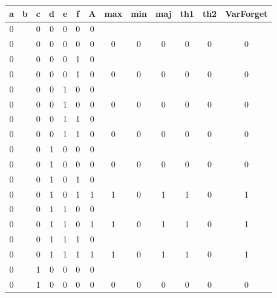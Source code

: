 \begin{table}[!tb]
    \centering
    \begin{tabular}{|c|c|c|c|c|c|c|c|c|c|c|c|c|}
        \hline
        \textbf{a} & \textbf{b} & \textbf{c} & \textbf{d} & \textbf{e} & \textbf{f} & \textbf{A} & \textbf{max} & \textbf{min} & \textbf{maj} & \textbf{th1} & \textbf{th2} & \textbf{VarForget} \\ \hline
        \rowcolor{gray!40} 0 &  & 0 & 0 & 0 & 0 & 0 &  &  &  &  &  &  \\ \hline
        \rowcolor{gray!40} 0 &  & 0 & 0 & 0 & 0 & 0 & 0 & 0 & 0 & 0 & 0 & 0 \\ \hline
        \rowcolor{blue!40} 0 &  & 0 & 0 & 0 & 1 & 0 &  &  &  &  &  &  \\ \hline
        \rowcolor{blue!40} 0 &  & 0 & 0 & 0 & 1 & 0 & 0 & 0 & 0 & 0 & 0 & 0 \\ \hline
        \rowcolor{red!40} 0 &  & 0 & 0 & 1 & 0 & 0 &  &  &  &  &  &  \\ \hline
        \rowcolor{red!40} 0 &  & 0 & 0 & 1 & 0 & 0 & 0 & 0 & 0 & 0 & 0 & 0 \\ \hline
        \rowcolor{green!40} 0 &  & 0 & 0 & 1 & 1 & 0 &  &  &  &  &  &  \\ \hline
        \rowcolor{green!40} 0 &  & 0 & 0 & 1 & 1 & 0 & 0 & 0 & 0 & 0 & 0 & 0 \\ \hline
        \rowcolor{yellow!40} 0 &  & 0 & 1 & 0 & 0 & 0 &  &  &  &  &  &  \\ \hline
        \rowcolor{yellow!40} 0 &  & 0 & 1 & 0 & 0 & 0 & 0 & 0 & 0 & 0 & 0 & 0 \\ \hline
        \rowcolor{gray!40} 0 &  & 0 & 1 & 0 & 1 & 0 &  &  &  &  &  &  \\ \hline
        \rowcolor{gray!40} 0 &  & 0 & 1 & 0 & 1 & 1 & 1 & 0 & 1 & 1 & 0 & 1 \\ \hline
        \rowcolor{blue!40} 0 &  & 0 & 1 & 1 & 0 & 0 &  &  &  &  &  &  \\ \hline
        \rowcolor{blue!40} 0 &  & 0 & 1 & 1 & 0 & 1 & 1 & 0 & 1 & 1 & 0 & 1 \\ \hline
        \rowcolor{red!40} 0 &  & 0 & 1 & 1 & 1 & 0 &  &  &  &  &  &  \\ \hline
        \rowcolor{red!40} 0 &  & 0 & 1 & 1 & 1 & 1 & 1 & 0 & 1 & 1 & 0 & 1 \\ \hline
        \rowcolor{green!40} 0 &  & 1 & 0 & 0 & 0 & 0 &  &  &  &  &  &  \\ \hline
        \rowcolor{green!40} 0 &  & 1 & 0 & 0 & 0 & 0 & 0 & 0 & 0 & 0 & 0 & 0 \\ \hline

\end{tabular}
\end{table}
